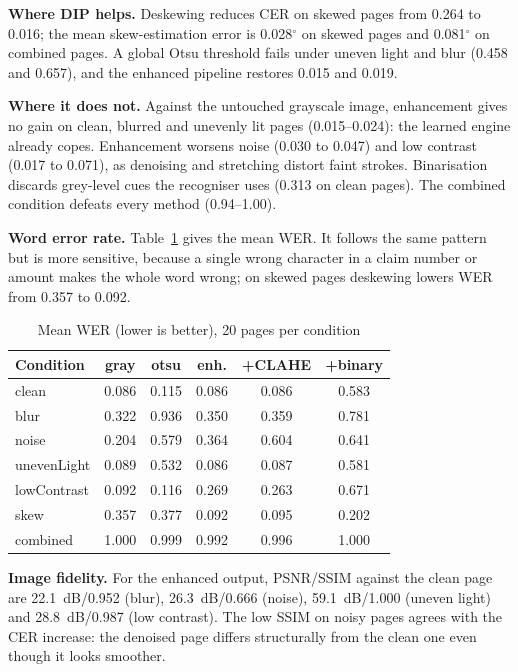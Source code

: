 \documentclass[conference]{IEEEtran}
\begin{document}
\textbf{Where DIP helps.} Deskewing reduces CER on skewed pages from 0.264 to 0.016; the mean skew-estimation error is 0.028$^\circ$ on skewed pages and 0.081$^\circ$ on combined pages. A global Otsu threshold fails under uneven light and blur (0.458 and 0.657), and the enhanced pipeline restores 0.015 and 0.019.

\textbf{Where it does not.} Against the untouched grayscale image, enhancement gives no gain on clean, blurred and unevenly lit pages (0.015--0.024): the learned engine already copes. Enhancement worsens noise (0.030 to 0.047) and low contrast (0.017 to 0.071), as denoising and stretching distort faint strokes. Binarisation discards grey-level cues the recogniser uses (0.313 on clean pages). The combined condition defeats every method (0.94--1.00).

\textbf{Word error rate.} Table~\ref{tab:wer} gives the mean WER. It follows the same pattern but is more sensitive, because a single wrong character in a claim number or amount makes the whole word wrong; on skewed pages deskewing lowers WER from 0.357 to 0.092.

\begin{table}[t]
\caption{Mean WER (lower is better), 20 pages per condition}
\label{tab:wer}
\centering
\small
\setlength{\tabcolsep}{3.5pt}
\begin{tabular}{|l|c|c|c|c|c|}
\hline
\textbf{Condition} & \textbf{gray} & \textbf{otsu} & \textbf{enh.} & \textbf{+CLAHE} & \textbf{+binary} \\
\hline
clean & 0.086 & 0.115 & 0.086 & 0.086 & 0.583 \\
blur & 0.322 & 0.936 & 0.350 & 0.359 & 0.781 \\
noise & 0.204 & 0.579 & 0.364 & 0.604 & 0.641 \\
unevenLight & 0.089 & 0.532 & 0.086 & 0.087 & 0.581 \\
lowContrast & 0.092 & 0.116 & 0.269 & 0.263 & 0.671 \\
skew & 0.357 & 0.377 & 0.092 & 0.095 & 0.202 \\
combined & 1.000 & 0.999 & 0.992 & 0.996 & 1.000 \\
\hline
\end{tabular}
\end{table}

\textbf{Image fidelity.} For the enhanced output, PSNR/SSIM against the clean page are 22.1~dB/0.952 (blur), 26.3~dB/0.666 (noise), 59.1~dB/1.000 (uneven light) and 28.8~dB/0.987 (low contrast). The low SSIM on noisy pages agrees with the CER increase: the denoised page differs structurally from the clean one even though it looks smoother.
\end{document}
